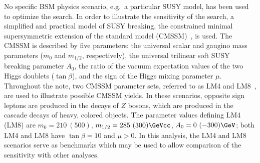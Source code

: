 No specific BSM  physics scenario, e.g.\ a particular  SUSY model, has
been  used  to  optimize  the  search.  In  order  to  illustrate  the
sensitivity of  the search, a  simplified and practical model  of SUSY
breaking,  the  constrained minimal  supersymmetric  extension of  the
standard  model  (CMSSM)~\cite{CMSSM,CMSSM2}, is  used.  The CMSSM  is
described by  five parameters: the  universal scalar and  gaugino mass
parameters   ($m_0$  and   $m_{1/2}$,  respectively),   the  universal
trilinear soft SUSY breaking parameter  $A_0$, the ratio of the vacuum
expectation values  of the two  Higgs doublets ($\tan\beta$),  and the
sign of  the Higgs mixing  parameter $\mu$.  Throughout the  note, two
CMSSM parameter sets, referred to  as LM4 and LM8~\cite{TDR}, are used
to  illustrate possible  CMSSM yields.   In these  scenarios, opposite
sign  leptons are  produced  in  the decays  of $Z$  bosons, which  are
produced  in  the  cascade  decays  of heavy,  colored  objects.   The
parameter  values defining  LM4  (LM8) are  $m_0  = 210~(500)$\GeVcc,
$m_{1/2} = 285~(300) \GeVcc$,  $A_0 = 0~(-300)\GeV$; both LM4 and
LM8 have $\tan\beta = 10$ and $\mu  > 0$. 
In this analysis, the  LM4 and LM8 scenarios serve as benchmarks
which may  be used to allow  comparison of the  sensitivity with other
analyses.
